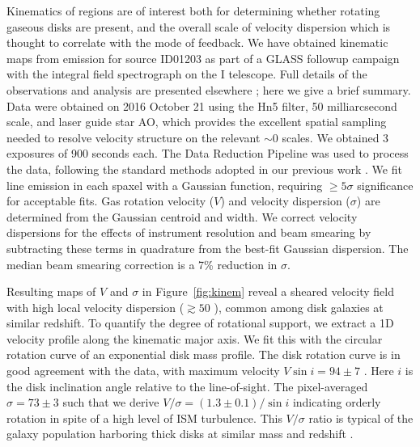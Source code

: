 Kinematics of \HII regions are of interest both for determining whether rotating gaseous disks are present, and the overall scale 
of velocity dispersion which is thought to correlate with the mode of feedback.  We have obtained kinematic maps from \Ha emission 
for source ID01203 as part of a GLASS followup campaign with the \osiris integral field spectrograph 
\citep{Larkin:2006jd} on the \keck I telescope. Full details of the observations and analysis are presented 
elsewhere \citep{Hirtenstein:2018tn}; here we give a brief summary.  Data were obtained on 2016 October 21 using 
the Hn5 filter, 50 milliarcsecond scale, and laser guide star AO, which provides the excellent spatial sampling 
needed to resolve velocity structure on the relevant $\sim$0 scales. We obtained 3 exposures of 900 
seconds each.  The \osiris Data Reduction Pipeline was used to process the data, following the standard methods 
adopted in our previous work \citep{2013ApJ...765...48J}. We fit \Ha line emission in each spaxel with a Gaussian 
function, requiring $\geq5\sigma$ significance for acceptable fits. Gas rotation velocity ($V$) and velocity 
dispersion ($\sigma$) are determined from the Gaussian centroid and width. We correct velocity dispersions for 
the effects of instrument resolution and beam smearing by subtracting these terms in quadrature from the best-fit 
Gaussian dispersion. The median beam smearing correction is a 7\% reduction in $\sigma$. 

Resulting maps of $V$ and $\sigma$ in Figure~\ref{fig:kinem} reveal a sheared velocity field with high local velocity dispersion
($\gtrsim50$ \kms), common among disk galaxies at similar redshift. To quantify the degree of rotational support, we extract a 1D
velocity profile along the kinematic major axis. We fit this with the circular rotation curve of an exponential
disk mass profile. The disk rotation curve is in good agreement with the data, with maximum velocity $V\sin i = 94\pm7$ \kms.
Here $i$ is the disk inclination angle relative to the line-of-sight. The pixel-averaged $\sigma = 73\pm3$ \kms 
such that we derive $V/\sigma = (1.3\pm0.1) / \sin i$ indicating orderly rotation in spite of a high level of ISM 
turbulence.
This $V/\sigma$ ratio is typical of the galaxy population harboring thick disks
at similar mass and redshift \citep{2015ApJ...799..209W,2015arXiv150901279L}.

